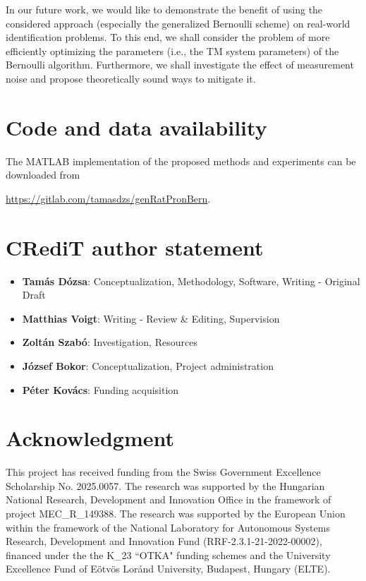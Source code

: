 \documentclass{arxiv}
\begin{document}
In our future work, we would like to demonstrate the benefit of using the considered approach (especially the generalized Bernoulli scheme) on real-world identification problems. To this end, we shall consider the problem of more efficiently optimizing the parameters (i.e., the TM system parameters) of the Bernoulli algorithm. Furthermore, we shall investigate the effect of measurement noise and propose theoretically sound ways to mitigate it.

\section*{Code and data availability}
The MATLAB implementation of the proposed methods and experiments can be downloaded from 
\begin{center}
\url{https://gitlab.com/tamasdzs/genRatPronBern}.
\end{center}

\section*{CRediT author statement}
\begin{itemize}
    \item \textbf{Tam\'as D\'ozsa}: Conceptualization, Methodology, Software, Writing - Original Draft
    \item \textbf{Matthias Voigt}:  Writing - Review \& Editing, Supervision 
    \item \textbf{Zolt\'an Szab\'o}: Investigation, Resources
    \item \textbf{J\'ozsef Bokor}: Conceptualization, Project administration
    \item \textbf{P\'eter Kov\'acs}: Funding acquisition
\end{itemize}

\section*{Acknowledgment}

This project has received funding from the Swiss Government Excellence Scholarship No. 2025.0057. The research was supported by the Hungarian National Research, Development and Innovation Office in the framework of project MEC\_R\_149388. The research was supported by the European Union within the framework of the National Laboratory for Autonomous Systems  Research, Development and Innovation Fund (RRF-2.3.1-21-2022-00002), financed under the the K\_23 ``OTKA" funding schemes and the University Excellence Fund of Eötvös Loránd University, Budapest, Hungary (ELTE).



\end{document}
